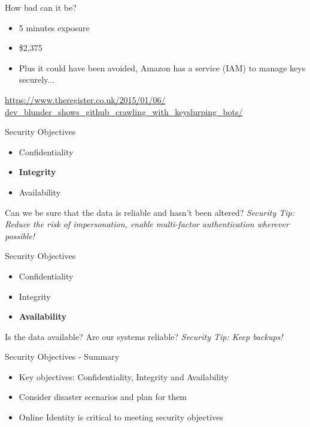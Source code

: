 \documentclass{beamer}
\begin{document}
\begin{frame}{How bad can it be?}
\begin{itemize}
\item 5 minutes exposure
\item \$2,375
\item Plus it could have been avoided, Amazon has a service (IAM) to manage keys securely...
\end{itemize}
{\small \url{https://www.theregister.co.uk/2015/01/06/ dev_blunder_shows_github_crawling_with_keyslurping_bots/} \par}
\end{frame}

\begin{frame}{Security Objectives}
	\begin{itemize}
		\item Confidentiality
		\item \textbf{Integrity}
        \item Availability
	\end{itemize}
    Can we be sure that the data is reliable and hasn't been altered?
	\linebreak
    \linebreak
    { \color{red} \textit{Security Tip: Reduce the risk of impersonation, enable multi-factor authentication wherever possible!} }
\end{frame}


\begin{frame}{Security Objectives}
	\begin{itemize}
		\item Confidentiality
		\item Integrity
        \item \textbf{Availability}
	\end{itemize}
    Is the data available? Are our systems reliable?
	\linebreak
    \linebreak
    { \color{red} \textit{Security Tip: Keep backups!} }
\end{frame}


\begin{frame}{Security Objectives - Summary}
\begin{itemize}
\item Key objectives: Confidentiality, Integrity and Availability
\item Consider disaster scenarios and plan for them 
\item Online Identity is critical to meeting security objectives
\end{itemize}
\end{frame}
\end{document}
